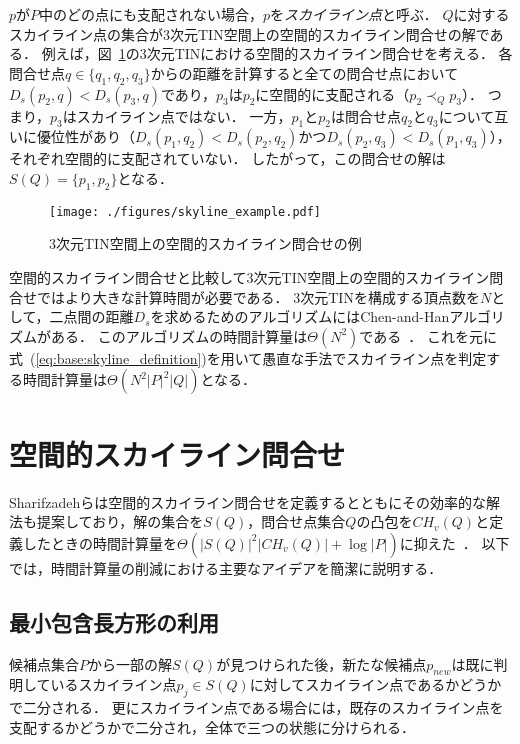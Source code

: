 \documentclass{fit}
\theoremstyle{definition}
\newcommand{\Fig}[1]{図~#1}
\newcommand{\Eq}[1]{式~(#1)}
\begin{document}
$p$が$P$中のどの点にも支配されない場合，$p$を\emph{スカイライン点}と呼ぶ．
$Q$に対するスカイライン点の集合が3次元TIN空間上の空間的スカイライン問合せの解である．
例えば，\Fig{\ref{fig:skyline_example}}の3次元TINにおける空間的スカイライン問合せを考える．
各問合せ点$q \in \{q_1,q_2,q_3\}$からの距離を計算すると全ての問合せ点において$D_s(p_2, q) < D_s(p_3, q)$であり，$p_3$は$p_2$に空間的に支配される（$p_2 \prec _Q p_3$）．
つまり，$p_3$はスカイライン点ではない．
一方，$p_1$と$p_2$は問合せ点$q_2$と$q_3$について互いに優位性があり（$D_s(p_1, q_2) < D_s(p_2, q_2)$かつ$D_s(p_2, q_3) < D_s(p_1, q_3)$），それぞれ空間的に支配されていない．
したがって，この問合せの解は$S(Q)=\{p_1,p_2\}$となる．
\begin{figure}[t]
  \centering
  \texttt{[image: ./figures/skyline\_example.pdf]}
  \caption{3次元TIN空間上の空間的スカイライン問合せの例}
  \label{fig:skyline_example}
\end{figure}

空間的スカイライン問合せと比較して3次元TIN空間上の空間的スカイライン問合せではより大きな計算時間が必要である．
3次元TINを構成する頂点数を$N$として，二点間の距離$D_s$を求めるためのアルゴリズムにはChen-and-Hanアルゴリズムがある．
このアルゴリズムの時間計算量は$\Theta (N^2)$である~\cite{scg:chen1990, acm:xin2009}．
これを元に\Eq{\ref{eq:base:skyline_definition}}を用いて愚直な手法でスカイライン点を判定する時間計算量は$\Theta (N^2|P|^2|Q|)$となる．

\section{空間的スカイライン問合せ}\label{sec:existing-work}

Sharifzadehらは空間的スカイライン問合せを定義するとともにその効率的な解法も提案しており，解の集合を$S(Q)$，問合せ点集合$Q$の凸包を$CH_v(Q)$と定義したときの時間計算量を$\Theta(|S(Q)|^2|CH_v(Q)|+\log |P|)$に抑えた~\cite{vldb:shahabi2006}．
以下では，時間計算量の削減における主要なアイデアを簡潔に説明する．

\subsection{最小包含長方形の利用}\label{subsec:exist:mbr}

候補点集合$P$から一部の解$S(Q)$が見つけられた後，新たな候補点$p_{new}$は既に判明しているスカイライン点$p_j \in S(Q)$に対してスカイライン点であるかどうかで二分される．
更にスカイライン点である場合には，既存のスカイライン点を支配するかどうかで二分され，全体で三つの状態に分けられる．
\end{document}

